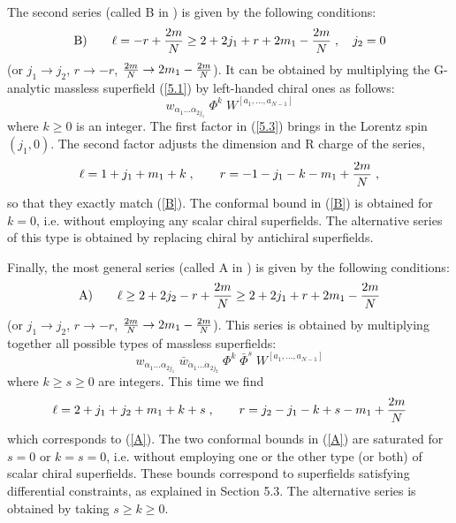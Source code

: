 \documentclass[a4paper,12pt]{article}
\begin{document}
The second series (called B in \cite{FS1}) is given by the 
following conditions:  
\begin{equation}\label{B}
  {\rm B)}\qquad \ell = -r+ {2m\over N} \geq 2+2j_1+r+2m_1 -{2m\over 
N}\;, \quad j_2=0
\end{equation}
(or  $j_1\rightarrow j_2$, $r\rightarrow -r$, ${2m\over 
N}\rightarrow 2m_1-{2m\over N}$). It can be obtained by 
multiplying the G-analytic massless superfield (\ref{5.1}) by 
left-handed chiral ones as follows: 
\begin{equation}\label{5.3}
  w_{\alpha_1\ldots\alpha_{2j_1}}\;\Phi^k\; W^{[a_1,\ldots,a_{N-1}]}
\end{equation}
where $k\geq 0$ is an integer. The first factor in (\ref{5.3}) 
brings in the Lorentz spin $(j_1,0)$. The second factor adjusts 
the dimension and R charge of the series, 
\begin{equation}\label{5.4}
\ell = 1+j_1+m_1+k\;, \qquad r=-1-j_1-k - m_1 + {2m\over N}\;, 
\end{equation}
so that they exactly match (\ref{B}). The conformal bound in  
(\ref{B}) is obtained for $k=0$, i.e. without employing any scalar 
chiral superfields. The alternative series of this type is 
obtained by replacing chiral by antichiral superfields. 

Finally, the most general series (called A in \cite{FS1}) is 
given by the following conditions: 
\begin{equation}\label{A}
  {\rm A)}\qquad   \ell \geq  2+2j_2-r+{2m\over N}\geq 2+2j_1+r+2m_1-{2m\over 
N}  
\end{equation}
(or  $j_1\rightarrow j_2$, $r\rightarrow -r$, ${2m\over 
N}\rightarrow 2m_1-{2m\over N}$).
This series is obtained by multiplying together all possible types 
of  massless superfields:   
\begin{equation}\label{5.6}
  w_{\alpha_1\ldots\alpha_{2j_1}}\;\bar 
w_{\dot\alpha_1\ldots\dot\alpha_{2j_2}}\; \Phi^k\; \bar\Phi^s\;  
W^{[a_1,\ldots,a_{N-1}]} 
\end{equation}
where $k\geq s\geq 0$ are integers. This time we find
\begin{equation}\label{5.7}
  \ell = 2+j_1+j_2+m_1+k+s\;, \qquad r=j_2-j_1-k+s-m_1+{2m\over 
N} 
\end{equation}
which corresponds to (\ref{A}). The two conformal bounds in  
(\ref{A}) are saturated for $s=0$ or $k=s=0$, i.e. without 
employing one or the other type (or both) of scalar chiral 
superfields. These bounds correspond to superfields satisfying 
differential constraints, as explained in Section 5.3. The 
alternative series is obtained by taking $s\geq k \geq 0$. 
\end{document}
